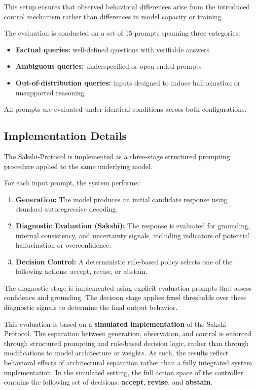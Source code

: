 \documentclass[12pt,a4paper]{article}
\begin{document}
This setup ensures that observed behavioral differences arise from the introduced control mechanism rather than differences in model capacity or training.

The evaluation is conducted on a set of 15 prompts spanning three categories:

\begin{itemize}
\item \textbf{Factual queries:} well-defined questions with verifiable answers
\item \textbf{Ambiguous queries:} underspecified or open-ended prompts
\item \textbf{Out-of-distribution queries:} inputs designed to induce hallucination or unsupported reasoning
\end{itemize}

All prompts are evaluated under identical conditions across both configurations.

\subsection{Implementation Details}

The Sakshi-Protocol is implemented as a three-stage structured prompting procedure applied to the same underlying model.

For each input prompt, the system performs:

\begin{enumerate}
\item \textbf{Generation:} The model produces an initial candidate response using standard autoregressive decoding.
\item \textbf{Diagnostic Evaluation (Sakshi):} The response is evaluated for grounding, internal consistency, and uncertainty signals, including indicators of potential hallucination or overconfidence.
\item \textbf{Decision Control:} A deterministic rule-based policy selects one of the following actions: accept, revise, or abstain.
\end{enumerate}

The diagnostic stage is implemented using explicit evaluation prompts that assess confidence and grounding. The decision stage applies fixed thresholds over these diagnostic signals to determine the final output behavior.

This evaluation is based on a \textbf{simulated implementation} of the Sakshi-Protocol. The separation between generation, observation, and control is enforced through structured prompting and rule-based decision logic, rather than through modifications to model architecture or weights. As such, the results reflect behavioral effects of architectural separation rather than a fully integrated system implementation. In the simulated setting, the full action space of the controller contains the following set of decisions: \textbf{accept}, \textbf{revise}, and \textbf{abstain}.
\end{document}
